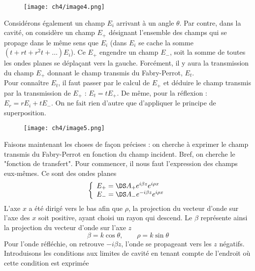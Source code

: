 	\begin{wrapfigure}[8]{r}{3cm}
	\vspace{-5mm}
	\texttt{[image: ch4/image4.png]}
	\end{wrapfigure}
Considérons également un champ $E_i$ arrivant à un angle $\theta$. Par contre, dans la cavité, on 
considère un champ $E_+$ désignant l'ensemble des champs qui se propage dans le même sens que 
$E_i$ (dans $E_i$ se cache la somme $(t+rt+r^2t+\dots)E_i$). Ce $E_+$ engendre un champ $E_-$, soit 
la somme de toutes les ondes planes se déplaçant vers la gauche. Forcément, il y aura la 
transmission du champ $E_+$ donnant le champ transmis du Fabry-Perrot, $E_t$.\\

Pour connaître $E_t$, il faut passer par le calcul de $E_+$ et déduire le champ transmis par la 
transmission de $E_+$ : $E_t=tE_+$. De même, pour la réflexion : $E_r = rE_i+tE_-$. On ne fait 
rien d'autre que d'appliquer le principe de superposition.\\

	\begin{wrapfigure}[10]{l}{3.5cm}
	\vspace{-5mm}
	\texttt{[image: ch4/image5.png]}
	\end{wrapfigure}
Faisons maintenant les choses de façon précises : on cherche à exprimer le champ transmis du 
Fabry-Perrot en fonction du champ incident. Bref, on cherche le "fonction de transfert". Pour 
commencer, il nous faut l'expression des champs eux-mêmes. Ce sont des ondes planes
\begin{equation}
\left\{\begin{array}{ll}
E_+ = \DS A_+e^{i\beta z}e^{i\rho x}\\
E_- = \DS A_-e^{-i\beta z}e^{i\rho x}
\end{array}\right.
\end{equation}
L'axe $x$ a été dirigé vers le bas afin que $\rho$, la projection du vecteur d'onde sur l'axe 
des $x$ soit positive, ayant choisi un rayon qui descend. Le $\beta$ représente ainsi la 
projection du vecteur d'onde sur l'axe $z$
\begin{equation}
\beta = k\cos\theta,\qquad \rho = k\sin\theta
\end{equation}
Pour l'onde réfléchie, on retrouve $-i\beta z$, l'onde se propageant vers les $z$ négatifs. 
Introduisons les conditions aux limites de cavité en tenant compte de l'endroit où cette 
condition est exprimée

